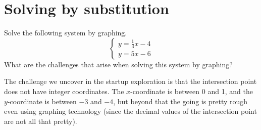 \section{Solving by substitution}
\label{sec:syssubstitution}

\begin{boxedexplore}
Solve the following system by graphing.
\[
\left\{%
\begin{array}{l}
y=\frac{1}{3}x-4\\[1ex]
y=5x-6
\end{array}
\right.
\]
What are the challenges that arise when solving this system by graphing?
\end{boxedexplore}

The challenge we uncover in the startup exploration is that the intersection point does not have integer coordinates. The $x$-coordinate is between 0 and 1, and the $y$-coordinate is between $-3$ and $-4$, but beyond that the going is pretty rough even using graphing technology (since the decimal values of the intersection point are not all that pretty).

\begin{center}
\end{center}


